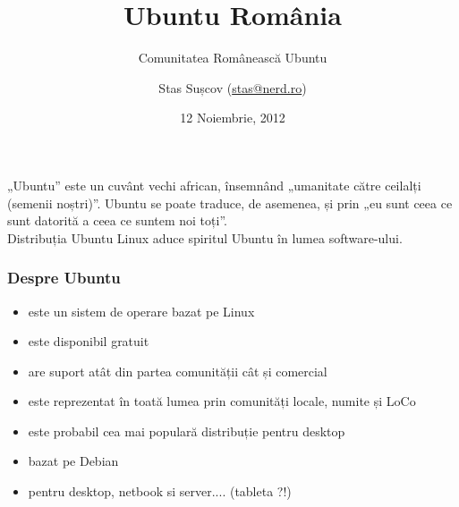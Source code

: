 \documentclass[compress]{beamer}
\title{Ubuntu România}
\subtitle{Comunitatea Românească Ubuntu}
\author{Stas Sușcov (\href{mailto:stas@nerd.ro}{stas@nerd.ro})}
\date{12 Noiembrie, 2012}
\institute{Programatica 2012, București, România}
\begin{document}
\maketitle


\begin{frame}
  \begin{center}
    \large
    „Ubuntu” este un cuvânt vechi african,
    însemnând „umanitate către ceilalți (semenii noștri)”.
    Ubuntu se poate traduce, de asemenea, și prin
    „eu sunt ceea ce sunt datorită a ceea ce suntem noi toți”.
    \\
    Distribuția Ubuntu Linux aduce spiritul Ubuntu în lumea software-ului.
  \end{center}
\end{frame}

\begin{frame}
\frametitle{Despre Ubuntu}

\begin{itemize}[<+->]
  \item este un sistem de operare bazat pe Linux
  \item este disponibil gratuit
  \item are suport atât din partea comunității cât și comercial
  \item este reprezentat în toată lumea prin comunități locale, numite și LoCo
  \item este probabil cea mai populară distribuție pentru desktop
  \item bazat pe Debian
  \item pentru desktop, netbook si server.... (tableta ?!)
\end{itemize}
\end{frame}
\end{document}

